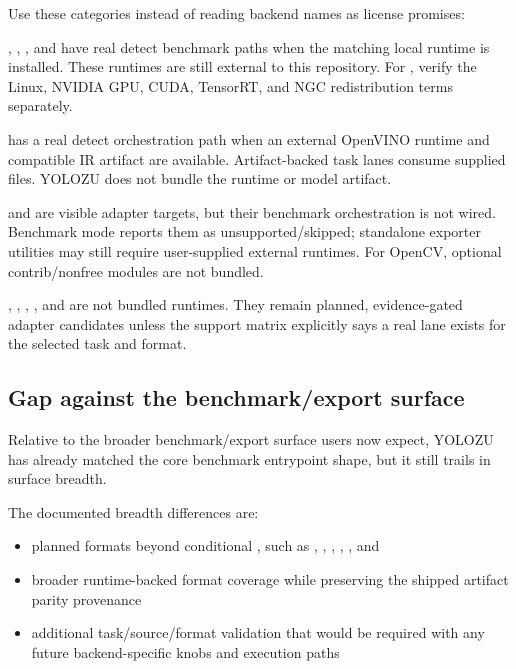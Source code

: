 Use these categories instead of reading backend names as license promises:
\begin{description}[leftmargin=3.2cm, style=nextline]
  \item[Real runtime path]
  , , , and  have real detect
  benchmark paths when the matching local runtime is installed. These runtimes
  are still external to this repository. For , verify the Linux,
  NVIDIA GPU, CUDA, TensorRT, and NGC redistribution terms separately.

  \item[Conditional real runtime path]
   has a real detect orchestration path when an external OpenVINO
  runtime and compatible IR artifact are available. Artifact-backed task lanes
  consume supplied files. YOLOZU does not bundle the runtime or model artifact.

  \item[Adapter target only]
   and  are visible adapter targets, but their
  benchmark orchestration is not wired. Benchmark mode reports them as
  unsupported/skipped; standalone exporter utilities may still require
  user-supplied external runtimes. For OpenCV, optional contrib/nonfree modules
  are not bundled.

  \item[Conditional adapter targets]
  , , , , and
   are not bundled runtimes. They remain planned,
  evidence-gated adapter candidates unless the support matrix explicitly says
  a real lane exists for the selected task and format.
\end{description}

\subsection{Gap against the benchmark/export surface}
Relative to the broader benchmark/export surface users now expect, YOLOZU has
already matched the core benchmark entrypoint shape, but it still trails in
surface breadth.

The documented breadth differences are:
\begin{itemize}
  \item planned formats beyond conditional , such as
  , , , , , and
  \item broader runtime-backed format coverage while preserving the shipped
  artifact parity provenance
  \item additional task/source/format validation that would be required with
  any future backend-specific knobs and execution paths
\end{itemize}

